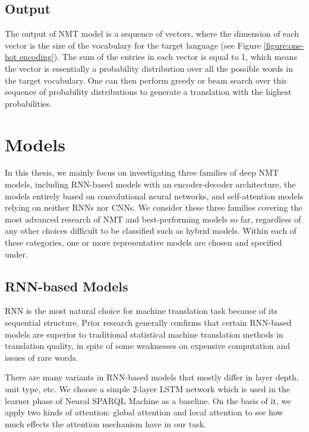\subsection{Output}

The output of NMT model is a sequence of vectors, where the dimension of each vector is the size of the vocabulary for the target language (see Figure \ref{figure:one-hot encoding}). The sum of the entries in each vector is equal to 1, which means the vector is essentially a probability distribution over all the possible words in the target vocabulary. One can then perform greedy or beam search over this sequence of probability distributions to generate a translation with the highest probabilities.


\section{Models}

In this thesis, we mainly focus on investigating three families of deep NMT models, including RNN-based models with an encoder-decoder architecture, the models entirely based on convolutional neural networks, and self-attention models relying on neither RNNs nor CNNs. We consider these three families covering the most advanced research of NMT and best-performing models so far, regardless of any other choices difficult to be classified such as hybrid models. Within each of these categories, one or more representative models are chosen and specified under.

\subsection{RNN-based Models}

RNN is the most natural choice for machine translation task because of its sequential structure. Prior research generally confirms that certain RNN-based models are superior to traditional statistical machine translation methods in translation quality, in spite of some weaknesses on expensive computation and issues of rare words. 

There are many variants in RNN-based models that mostly differ in layer depth, unit type, etc. We choose a simple 2-layer LSTM network which is used in the learner phase of Neural SPARQL Machine \cite{Soru2018a} as a baseline. On the basis of it, we apply two kinds of attention: global attention \cite{Bahdanau2014} and local attention \cite{Luong2015} to see how much effects the attention mechanism have in our task.

